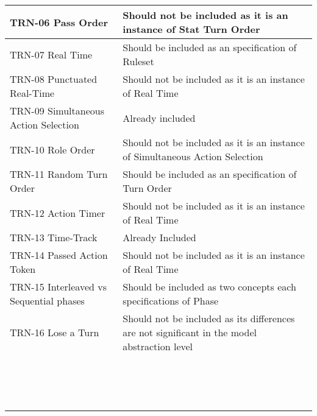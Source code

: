 \begin{longtable}{|m{7cm}|m{7cm}|}
        \hline
        TRN-06 Pass Order & Should not be included as it is an instance of Stat Turn Order \\
        \hline
        TRN-07 Real Time & Should be included as an specification of Ruleset \\
        \hline
        TRN-08 Punctuated Real-Time & Should not be included as it is an instance of Real Time \\
        \hline
        TRN-09 Simultaneous Action Selection & Already included \\
        \hline
        TRN-10 Role Order & Should not be included as it is an instance of Simultaneous Action Selection \\
        \hline
        TRN-11 Random Turn Order & Should be included as an specification of Turn Order \\
        \hline
        TRN-12 Action Timer & Should not be included as it is an instance of Real Time \\
        \hline
        TRN-13 Time-Track & Already Included \\
        \hline
        TRN-14 Passed Action Token & Should not be included as it is an instance of Real Time \\
        \hline
        TRN-15 Interleaved vs Sequential phases & Should be included as two concepts each specifications of Phase \\
        \hline
        TRN-16 Lose a Turn & Should not be included as its differences are not significant in the model abstraction level \\
        \hline
         &  \\
        \hline
         &  \\
        \hline
         &  \\
        \hline
         &  \\
        \hline
         &  \\
        \hline
         &  \\
        \hline
         &  \\
        \hline
         &  \\
        \hline
         &  \\
        \hline
         &  \\
        \hline
         &  \\
        \hline
         &  \\
        \hline
         &  \\
        \hline
         &  \\
        \hline
         &  \\
        
    \end{longtable}


